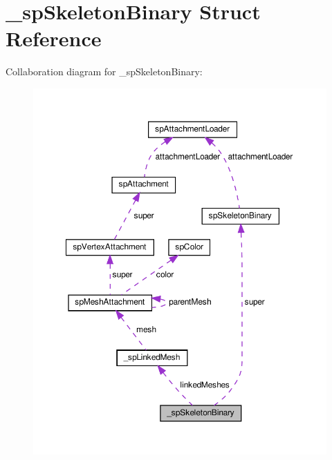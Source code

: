 \hypertarget{struct__spSkeletonBinary}{}\section{\+\_\+sp\+Skeleton\+Binary Struct Reference}
\label{struct__spSkeletonBinary}


Collaboration diagram for \+\_\+sp\+Skeleton\+Binary\+:
\nopagebreak
\begin{figure}[H]
\begin{center}
\leavevmode
\includegraphics[width=350pt]{struct__spSkeletonBinary__coll__graph}
\end{center}
\end{figure}
